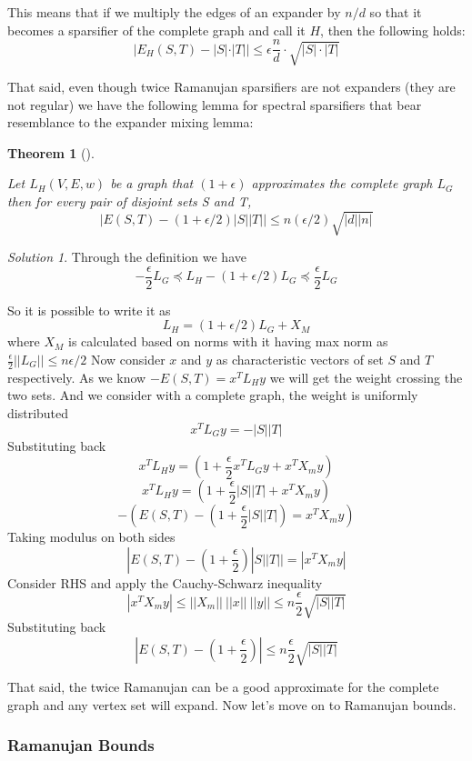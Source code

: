 \documentclass[
  letterpaper,
  DIV=11,
  numbers=noendperiod]{scrartcl}
\theoremstyle{plain}
\theoremstyle{plain}
\theoremstyle{plain}
\theoremstyle{definition}
\theoremstyle{plain}
\newtheorem{theorem}{Theorem}[section]
\theoremstyle{remark}
\newtheorem*{solution}{Solution}
\begin{document}
This means that if we multiply the edges of an expander by \(n/d\) so
that it becomes a sparsifier of the complete graph and call it \(H\),
then the following holds:
\[|E_H(S, T) - |S| \cdot |T|| \le \epsilon \frac{n}{d} \cdot \sqrt{|S| \cdot |T|}\]

That said, even though twice Ramanujan sparsifiers are not expanders
(they are not regular) we have the following lemma for spectral
sparsifiers that bear resemblance to the expander mixing lemma:

\leavevmode{}%
\begin{theorem}[]\label{thm-approx-mixing-lemma}

Let \(L_H(V,E,w)\) be a graph that \((1+\epsilon)\) approximates the
complete graph \(L_G\) then for every pair of disjoint sets S and T, \[
|E(S,T)-(1+\epsilon/2)|S||T||\leq n(\epsilon/2) \sqrt{|d||n|}
\]

\end{theorem}

\begin{solution}

Through the definition we have \[
  -\frac{\epsilon}{2} L_G \preceq L_H-(1+\epsilon/2)L_G \preceq \frac{\epsilon}{2} L_G
\]

So it is possible to write it as \[
  L_H=(1+\epsilon/2)L_G+X_M
\] where \(X_M\) is calculated based on norms with it having max norm as
\(\frac{\epsilon}{2} ||L_G|| \leq n\epsilon/2\) Now consider \(x\) and
\(y\) as characteristic vectors of set \(S\) and \(T\) respectively. As
we know \(-E(S,T) = x^TL_Hy\) we will get the weight crossing the two
sets. And we consider with a complete graph, the weight is uniformly
distributed \[x^TL_Gy= -|S||T|\] Substituting back
\[x^TL_Hy = (1+\frac{\epsilon}{2}x^TL_Gy+x^TX_my)\]
\[x^TL_Hy = (1+\frac{\epsilon}{2}|S||T|+x^TX_my)\]
\[-(E(S,T) -(1+\frac{\epsilon}{2}|S||T|)= x^TX_my)\] Taking modulus on
both sides \[|E(S,T) -(1+\frac{\epsilon}{2})|S||T||= |x^TX_my|\]
Consider RHS and apply the Cauchy-Schwarz inequality
\[|x^TX_my|\leq||X_m||\:||x||\:||y||\leq n\frac{\epsilon}{2}\sqrt{|S||T|}\]
Substituting back
\[|E(S,T) -(1+\frac{\epsilon}{2})| \leq n\frac{\epsilon}{2}\sqrt{|S||T|}\]

\end{solution}

That said, the twice Ramanujan can be a good approximate for the
complete graph and any vertex set will expand. Now let's move on to
Ramanujan bounds.

\hypertarget{ramanujan-bounds}{%
\subsubsection{Ramanujan Bounds}\label{ramanujan-bounds}}
\end{document}
